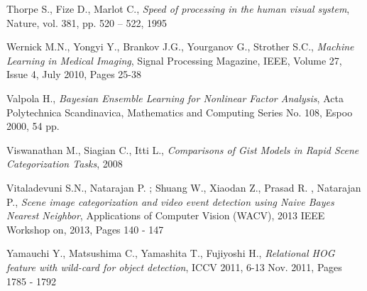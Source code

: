\begin{thebibliography}{100}
 Thorpe S., Fize D., Marlot C., \emph{Speed of processing in the human visual system}, Nature, vol. 381, pp. 520 – 522, 1995

 Wernick M.N., Yongyi Y., Brankov J.G., Yourganov G., Strother S.C., \emph{Machine Learning in Medical Imaging}, Signal Processing Magazine, IEEE, Volume 27,  Issue 4, July 2010, Pages 25-38

 Valpola H., \emph{Bayesian Ensemble Learning for Nonlinear Factor Analysis}, Acta Polytechnica Scandinavica, Mathematics and Computing Series No. 108, Espoo 2000, 54 pp.

  Viswanathan M., Siagian C., Itti L., \emph{Comparisons of Gist Models in Rapid Scene Categorization Tasks}, 2008

 Vitaladevuni S.N., Natarajan P. ; Shuang W., Xiaodan Z., Prasad R. , Natarajan P., \emph{Scene image categorization and video event detection using Naive Bayes Nearest Neighbor}, Applications of Computer Vision (WACV), 2013 IEEE Workshop on, 2013, Pages 140 - 147

 Yamauchi Y., Matsushima C., Yamashita T., Fujiyoshi H., \emph{Relational HOG feature with wild-card for object detection}, ICCV 2011, 6-13 Nov. 2011, Pages 1785 - 1792
 
\end{thebibliography} 